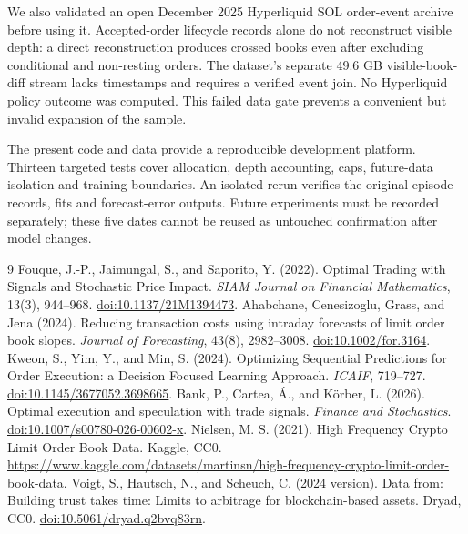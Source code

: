 \documentclass[10pt,a4paper]{article}
\begin{document}
We also validated an open December 2025 Hyperliquid SOL order-event archive before using it. Accepted-order lifecycle records alone do not reconstruct visible depth: a direct reconstruction produces crossed books even after excluding conditional and non-resting orders. The dataset's separate 49.6 GB visible-book-diff stream lacks timestamps and requires a verified event join. No Hyperliquid policy outcome was computed. This failed data gate prevents a convenient but invalid expansion of the sample.

The present code and data provide a reproducible development platform. Thirteen targeted tests cover allocation, depth accounting, caps, future-data isolation and training boundaries. An isolated rerun verifies the original episode records, fits and forecast-error outputs. Future experiments must be recorded separately; these five dates cannot be reused as untouched confirmation after model changes.

\begin{thebibliography}{9}\small
{} Fouque, J.-P., Jaimungal, S., and Saporito, Y. (2022). Optimal Trading with Signals and Stochastic Price Impact. \emph{SIAM Journal on Financial Mathematics}, 13(3), 944--968. \href{https://doi.org/10.1137/21M1394473}{doi:10.1137/21M1394473}.
 Ahabchane, Cenesizoglu, Grass, and Jena (2024). Reducing transaction costs using intraday forecasts of limit order book slopes. \emph{Journal of Forecasting}, 43(8), 2982--3008. \href{https://doi.org/10.1002/for.3164}{doi:10.1002/for.3164}.
 Kweon, S., Yim, Y., and Min, S. (2024). Optimizing Sequential Predictions for Order Execution: a Decision Focused Learning Approach. \emph{ICAIF}, 719--727. \href{https://doi.org/10.1145/3677052.3698665}{doi:10.1145/3677052.3698665}.
 Bank, P., Cartea, \'A., and K\"orber, L. (2026). Optimal execution and speculation with trade signals. \emph{Finance and Stochastics}. \href{https://doi.org/10.1007/s00780-026-00602-x}{doi:10.1007/s00780-026-00602-x}.
 Nielsen, M. S. (2021). High Frequency Crypto Limit Order Book Data. Kaggle, CC0. \url{https://www.kaggle.com/datasets/martinsn/high-frequency-crypto-limit-order-book-data}.
 Voigt, S., Hautsch, N., and Scheuch, C. (2024 version). Data from: Building trust takes time: Limits to arbitrage for blockchain-based assets. Dryad, CC0. \href{https://doi.org/10.5061/dryad.q2bvq83rn}{doi:10.5061/dryad.q2bvq83rn}.
\end{thebibliography}
\end{document}

